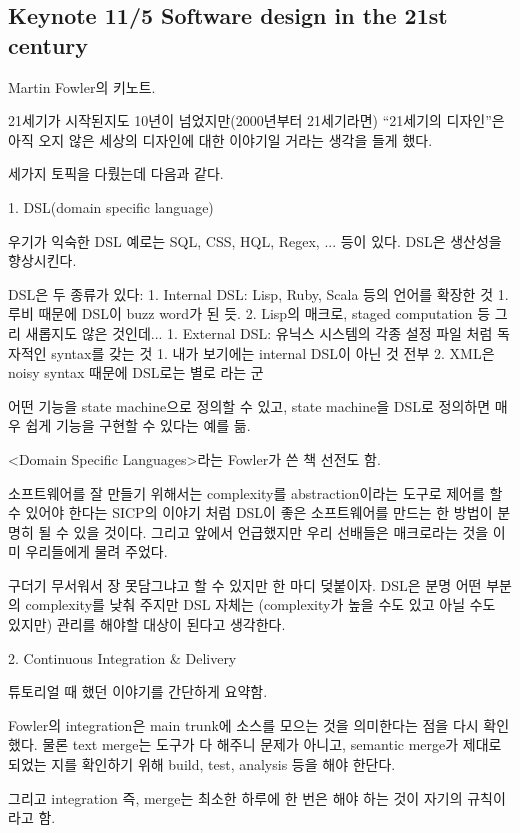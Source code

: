 \documentclass[a4paper]{article}
\begin{document}
\subsection{Keynote 11/5 Software design in the 21st century}
 
Martin Fowler의 키노트.
 
21세기가 시작된지도  10년이 넘었지만(2000년부터 21세기라면) “21세기의 디자인”은 아직 오지 않은 세상의 디자인에 대한 이야기일 거라는 생각을 들게 했다.
 
세가지 토픽을 다뤘는데 다음과 같다.
 
1. DSL(domain specific language)
 
우기가 익숙한 DSL 예로는 SQL, CSS, HQL, Regex, ... 등이 있다. DSL은 생산성을 향상시킨다.
 
DSL은 두 종류가 있다:
1. Internal DSL: Lisp, Ruby, Scala  등의 언어를 확장한 것
1. 루비 때문에 DSL이 buzz word가 된 듯.
2. Lisp의 매크로, staged computation 등 그리 새롭지도 않은 것인데...
1. External DSL: 유닉스 시스템의 각종 설정 파일 처럼 독자적인  syntax를 갖는 것
1. 내가 보기에는 internal DSL이 아닌 것 전부
2. XML은 noisy syntax 때문에 DSL로는 별로 라는 군
 
어떤 기능을 state machine으로 정의할 수 있고, state machine을 DSL로 정의하면 매우 쉽게 기능을 구현할 수 있다는 예를 듦.
 
<Domain Specific Languages>라는 Fowler가 쓴 책 선전도 함.
 
소프트웨어를 잘 만들기 위해서는 complexity를 abstraction이라는 도구로 제어를 할 수 있어야 한다는 SICP의 이야기 처럼 DSL이 좋은 소프트웨어를 만드는 한 방법이 분명히 될 수 있을 것이다. 그리고 앞에서 언급했지만 우리 선배들은 매크로라는 것을 이미 우리들에게 물려 주었다.
 
구더기 무서워서 장 못담그냐고 할 수 있지만 한 마디 덪붙이자. DSL은 분명   어떤 부분의 complexity를 낮춰 주지만  DSL 자체는 (complexity가 높을 수도 있고 아닐 수도 있지만) 관리를 해야할  대상이 된다고 생각한다.
 
2. Continuous Integration \& Delivery
 
튜토리얼 때 했던 이야기를 간단하게 요약함. 
 
Fowler의 integration은 main trunk에 소스를 모으는 것을 의미한다는 점을 다시 확인했다.
물론 text merge는 도구가 다 해주니 문제가 아니고, semantic merge가 제대로 되었는 지를 확인하기 위해  build, test, analysis 등을 해야 한단다.
 
그리고 integration 즉, merge는 최소한 하루에 한 번은 해야 하는 것이 자기의 규칙이라고 함.
 
\end{document}
